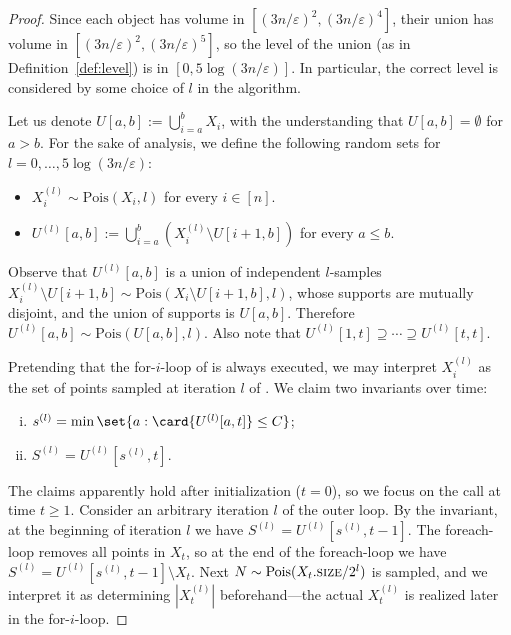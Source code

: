 \documentclass[a4paper, 11pt]{article}
\newcommand{\size}{\textsc{size}}
\newcommand{\Pois}{\mathrm{Pois}}
\newcommand{\eps}{\varepsilon}
\begin{document}
\begin{proof}
    Since each object has volume in $[(3n/\eps)^2, (3n/\eps)^4]$, their union has volume in $[(3n/\eps)^2, (3n/\eps)^5]$, so the level of the union (as in Definition~\ref{def:level}) is in $[0, 5\log(3n/\eps)]$. In particular, the correct level is considered by some choice of $l$ in the algorithm.
    
    Let us denote $U[a,b] := \bigcup_{i=a}^b X_i$, with the understanding that $U[a,b] = \emptyset$ for $a > b$. For the sake of analysis, we define the following random sets for $l = 0, \dots, 5 \log(3n/\eps)$:
    \begin{itemize}
        \item $X_i^{(l)} \sim \Pois(X_i, l)$ for every $i \in [n]$.
        \item $U^{(l)}[a,b] := \bigcup_{i=a}^{b} ( X_i^{(l)} \setminus U[i+1,b] )$ for every $a \leq b$.
    \end{itemize}
    Observe that $U^{(l)}[a,b]$ is a union of independent $l$-samples $X_i^{(l)} \setminus U[i+1,b] \sim \Pois(X_i \setminus U[i+1,b], l)$, whose supports are mutually disjoint, and the union of supports is $U[a,b]$. Therefore $U^{(l)}[a,b] \sim \Pois(U[a,b], l)$. Also note that $U^{(l)}[1,t] \supseteq \cdots \supseteq U^{(l)}[t,t]$.

    Pretending that the for-$i$-loop of \ins is always executed, we may interpret $X_i^{(l)}$ as the set of points sampled at iteration $l$ of . We claim two invariants over time:
    \begin{enumerate}[(i)]
        \item $s^{(l)} = \min \set{a : \card{U^{(l)}[a,t]} \leq C }$;
        \item $S^{(l)} = U^{(l)}[s^{(l)}, t]$.
    \end{enumerate}
    
    The claims apparently hold after initialization ($t = 0$), so we focus on the call  at time $t \geq 1$. Consider an arbitrary iteration $l$ of the outer loop. By the invariant, at the beginning of iteration $l$ we have $S^{(l)} = U^{(l)}[s^{(l)}, t-1]$. The foreach-loop removes all points in $X_t$, so at the end of the foreach-loop we have $S^{(l)} = U^{(l)}[s^{(l)}, t-1] \setminus X_t$. Next $N \sim \Pois(X_t.\size/2^l)$ is sampled, and we interpret it as determining $|X_t^{(l)}|$ beforehand---the actual $X_t^{(l)}$ is realized later in the for-$i$-loop. 
    

\end{proof}
\end{document}

